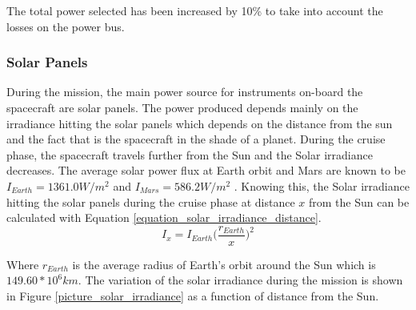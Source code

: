 \documentclass[a4paper, oneside, 11pt]{article}
\begin{document}
The total power selected has been increased by 10\% to take into account the losses on the power bus.

\subsubsection{Solar Panels}

\noindent During the mission, the main power source for instruments on-board the spacecraft are solar panels. The power produced depends mainly on the irradiance hitting the solar panels which depends on the distance from the sun and the fact that is the spacecraft in the shade of a planet. %
During the cruise phase, the spacecraft travels further from the Sun and the Solar irradiance decreases. %
The average solar power flux at Earth orbit and Mars are known to be $I_{Earth} = 1361.0W/m^2$ \cite{Earth Fact Sheet} and $I_{Mars} = 586.2W/m^2$ \cite{Mars Fact Sheet}. Knowing this, the Solar irradiance hitting the solar panels during the cruise phase at distance $x$ from the Sun can be calculated with Equation \ref{equation_solar_irradiance_distance}.\\

\begin{equation}
I_x=I_{Earth}\Bigg(\frac{r_{Earth}}{x}\Bigg)^2
\label{equation_solar_irradiance_distance}
\end{equation}

Where $r_{Earth}$ is the average radius of Earth's orbit around the Sun which is $149.60*10^6km$. The variation of the solar irradiance during the mission is shown in Figure \ref{picture_solar_irradiance} as a function of distance from the Sun.\\
\end{document}
